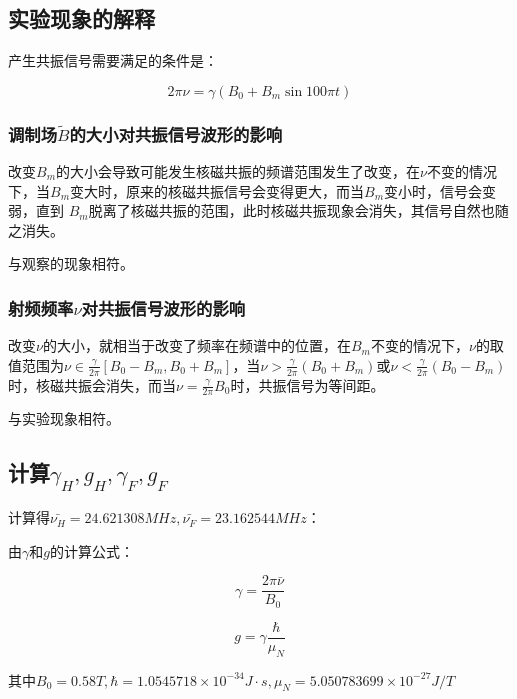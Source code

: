 \documentclass[a4paper,UTF8]{ctexart}
\begin{document}
\subsection{实验现象的解释}

产生共振信号需要满足的条件是：

\begin{equation}
    2\pi \nu = \gamma (B_0 + B_m \sin{100\pi t})
\end{equation}

\subsubsection{调制场$\tilde{B}$的大小对共振信号波形的影响}

改变$B_m$的大小会导致可能发生核磁共振的频谱范围发生了改变，在$\nu$不变的情况下，当$B_m$变大时，原来的核磁共振信号会变得更大，而当$B_m$变小时，信号会变弱，直到
$B_m$脱离了核磁共振的范围，此时核磁共振现象会消失，其信号自然也随之消失。

与观察的现象相符。

\subsubsection{射频频率$\nu$对共振信号波形的影响}

改变$\nu$的大小，就相当于改变了频率在频谱中的位置，在$B_m$不变的情况下，$\nu$的取值范围为$\nu \in \frac{\gamma}{2\pi}[B_0-B_m,B_0+B_m]$，当$\nu > \frac{\gamma}{2\pi}(B_0+B_m)$或$\nu < \frac{\gamma}{2\pi}(B_0-B_m)$时，核磁共振会消失，而当$\nu= \frac{\gamma}{2\pi}B_0$时，共振信号为等间距。

与实验现象相符。

\subsection{计算$\gamma_H,g_H,\gamma_F,g_F$}

计算得$\bar{\nu_H} = 24.621308 MHz,\bar{\nu_F} = 23.162544MHz$：

由$\gamma$和$g$的计算公式：

\begin{equation}
    \gamma = \frac{2\pi \bar{\nu}}{B_0}
\end{equation}

\begin{equation}
    g = \gamma \frac{\hbar}{\mu_{N}}
\end{equation}

其中$B_0 = 0.58T,\hbar = 1.0545718 \times 10^{-34} J\cdot s,\mu_N = 5.050783699 \times 10^{-27} J/T$
\end{document}

